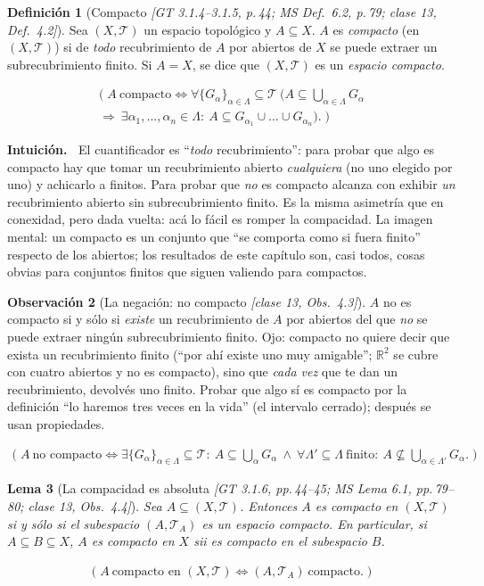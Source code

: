 \documentclass[11pt,a4paper]{article}
\newenvironment{intuicion}{\begin{cajaint}\small\textbf{Intuición.\ }}{\end{cajaint}}
\newcommand{\lgc}[1]{\par\vspace{-3pt}\begin{gather*}\big(\;#1\;\big)\end{gather*}\vspace{-6pt}}
\theoremstyle{definition}
\newtheorem{definicion}{Definición}[section]
\newtheorem{observacion}[definicion]{Observación}
\theoremstyle{plain}
\newtheorem{lema}[definicion]{Lema}
\newcommand{\fnt}[1]{{\normalfont\small\itshape\color{gray!150!black}[#1]}}
\newcommand{\R}{\mathbb{R}}
\newcommand{\tp}{\mathcal{T}}
\begin{document}
\begin{definicion}[Compacto \fnt{GT 3.1.4--3.1.5, p.\,44; MS Def.\ 6.2, p.\,79; clase 13, Def.\ 4.2}]\label{cp:def}
Sea $(X,\tp)$ un espacio topológico y $A\subseteq X$. $A$ es \emph{compacto} (en $(X,\tp)$) si de \emph{todo} recubrimiento de $A$ por abiertos de $X$ se puede extraer un subrecubrimiento finito. Si $A=X$, se dice que $(X,\tp)$ es un \emph{espacio compacto}.
\lgc{A\ \text{compacto}\iff \forall\{G_\alpha\}_{\alpha\in\Lambda}\subseteq\tp\ \Big(A\subseteq\textstyle\bigcup_{\alpha\in\Lambda}G_\alpha\\ \Rightarrow\ \exists\alpha_1,\dots,\alpha_n\in\Lambda:\ A\subseteq G_{\alpha_1}\cup\dots\cup G_{\alpha_n}\Big).}
\end{definicion}

\begin{intuicion}
El cuantificador es ``\emph{todo} recubrimiento'': para probar que algo es compacto hay que tomar un recubrimiento abierto \emph{cualquiera} (no uno elegido por uno) y achicarlo a finitos. Para probar que \emph{no} es compacto alcanza con exhibir \emph{un} recubrimiento abierto sin subrecubrimiento finito. Es la misma asimetría que en conexidad, pero dada vuelta: acá lo fácil es romper la compacidad. La imagen mental: un compacto es un conjunto que ``se comporta como si fuera finito'' respecto de los abiertos; los resultados de este capítulo son, casi todos, cosas obvias para conjuntos finitos que siguen valiendo para compactos.
\end{intuicion}

\begin{observacion}[La negación: no compacto \fnt{clase 13, Obs.\ 4.3}]
$A$ no es compacto si y sólo si \emph{existe} un recubrimiento de $A$ por abiertos del que \emph{no} se puede extraer ningún subrecubrimiento finito. Ojo: compacto no quiere decir que exista un recubrimiento finito (``por ahí existe uno muy amigable''; $\R^2$ se cubre con cuatro abiertos y no es compacto), sino que \emph{cada vez} que te dan un recubrimiento, devolvés uno finito. Probar que algo sí es compacto por la definición ``lo haremos tres veces en la vida'' (el intervalo cerrado); después se usan propiedades.
\lgc{A\ \text{no compacto}\iff \exists\{G_\alpha\}_{\alpha\in\Lambda}\subseteq\tp:\ A\subseteq\textstyle\bigcup_\alpha G_\alpha\ \wedge\ \forall\Lambda'\subseteq\Lambda\ \text{finito}:\ A\not\subseteq\bigcup_{\alpha\in\Lambda'}G_\alpha.}
\end{observacion}

\begin{lema}[La compacidad es absoluta \fnt{GT 3.1.6, pp.\,44--45; MS Lema 6.1, pp.\,79--80; clase 13, Obs.\ 4.4}]\label{cp:absoluta}
Sea $A\subseteq(X,\tp)$. Entonces $A$ es compacto en $(X,\tp)$ si y sólo si el subespacio $(A,\tp_A)$ es un espacio compacto. En particular, si $A\subseteq B\subseteq X$, $A$ es compacto en $X$ sii es compacto en el subespacio $B$.
\lgc{A\ \text{compacto en } (X,\tp)\iff (A,\tp_A)\ \text{compacto}.}
\end{lema}
\end{document}
